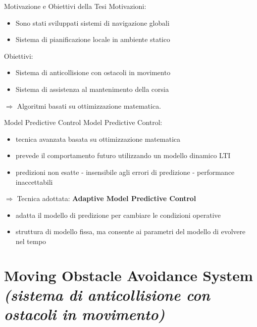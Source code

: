 \documentclass{beamer}
\begin{document}
	\begin{frame}{Motivazione e Obiettivi della Tesi}
	Motivazioni:
		\begin{itemize}
			\item Sono stati sviluppati sistemi di navigazione globali
			\item Sistema di pianificazione locale in ambiente statico
		\end{itemize}
	Obiettivi:
		\begin{itemize}
			\item Sistema di anticollisione con ostacoli in movimento
			\item Sistema di assistenza al mantenimento della corsia
		\end{itemize}
	$\Longrightarrow$ Algoritmi basati su ottimizzazione matematica.
	\end{frame}


	\begin{frame}{Model Predictive Control}
		Model Predictive Control:
		\begin{itemize}
			\item tecnica avanzata basata su ottimizzazione matematica
			\item prevede il comportamento futuro utilizzando un modello dinamico LTI
			\item predizioni non esatte - insensibile agli errori di predizione - performance inaccettabili
		\end{itemize}
		$\Longrightarrow$ Tecnica adottata: {\bfseries Adaptive Model Predictive Control}
		\begin{itemize}
			\item adatta il modello di predizione per cambiare le condizioni operative
			\item struttura di modello fissa, ma consente ai parametri del modello di evolvere nel tempo
		\end{itemize}
	\end{frame}
	
	\section{Moving Obstacle Avoidance System {\itshape \large (sistema di anticollisione con ostacoli in movimento)}} %
		
\end{document}

